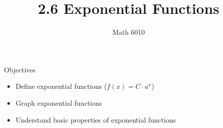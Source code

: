 \documentclass[]{beamer}
\title{2.6 Exponential Functions}
\author{Math 6010}
\institute{9-20-2023}
\date{}
\begin{document}
	\beamertemplatenavigationsymbolsempty
	
	\frame{\titlepage}
	
%		
	
	\begin{frame}{Objectives}
		\begin{itemize}
			\item Define exponential functions ($f(x) = C\cdot a^x$)
			\pause\vfill
			\item Graph exponential functions
			\pause\vfill
			\item Understand basic properties of exponential functions
		\end{itemize}
	\end{frame}
	
\end{document}
